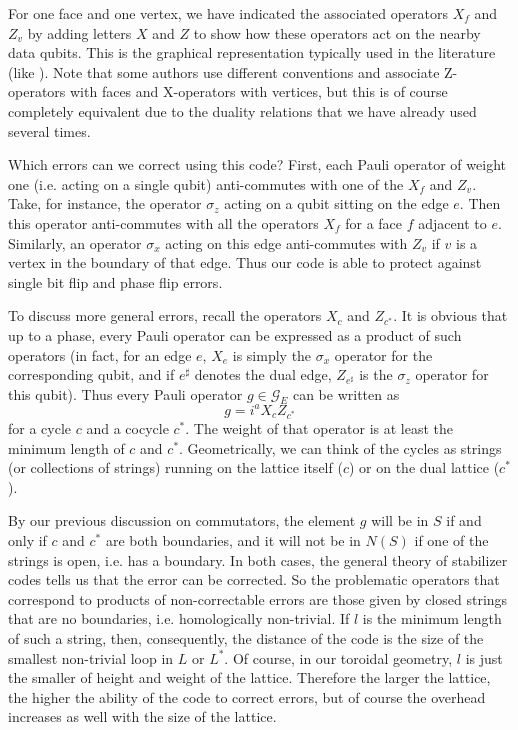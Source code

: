 \documentclass[a4paper, draft]{article}
\theoremstyle{own}
\theoremstyle{remark}
\begin{document}
For one face and one vertex, we have indicated the associated operators $X_f$ and $Z_v$ by adding letters $X$ and $Z$ to show how these operators act on the nearby data qubits. This is the graphical representation typically used in the literature (like \cite{SurfaceCodes}). Note that some authors use different conventions and associate Z-operators with faces and X-operators with vertices, but this is of course completely equivalent due to the duality relations that we have already used several times.


Which errors can we correct using this code? First, each Pauli operator of weight one (i.e. acting on a single qubit) anti-commutes with one of the $X_f$ and $Z_v$. Take, for instance, the operator $\sigma_z$ acting on a qubit sitting on the edge $e$. Then this operator anti-commutes with all the operators $X_f$ for a face $f$ adjacent to $e$. Similarly, an operator $\sigma_x$ acting on this edge anti-commutes with $Z_v$ if $v$ is a vertex in the boundary of that edge. Thus our code is able to protect against single bit flip and phase flip errors.

To discuss more general errors, recall the operators $X_c$ and $Z_{c^*}$. It is obvious that up to a phase, every Pauli operator can be expressed as a product of such operators (in fact, for an edge $e$, $X_e$ is simply the $\sigma_x$ operator for the corresponding qubit, and if $e^\sharp$ denotes the dual edge, $Z_{e^\sharp}$ is the $\sigma_z$ operator for this qubit). Thus every Pauli operator $g \in \mathcal{G}_E$ can be written as
$$
g = i^a  X_c Z_{c^*}
$$
for a cycle $c$ and a cocycle $c^*$. The weight of that operator is at least the minimum length of $c$ and $c^*$. Geometrically, we can think of the cycles as strings (or collections of strings) running on the lattice itself ($c$) or on the dual lattice ($c^*$).

By our previous discussion on commutators, the element $g$ will be in $S$ if and only if $c$ and $c^*$ are both boundaries, and it will not be in $N(S)$ if one of the strings is open, i.e. has a boundary. In both cases, the general theory of stabilizer codes tells us that the error can be corrected. So the problematic operators that correspond to products of non-correctable errors are those given by closed strings that are no boundaries, i.e. homologically non-trivial. If $l$ is the minimum length of such a string, then, consequently, the distance of the code is the size of the smallest non-trivial loop in $L$ or $L^*$. Of course, in our toroidal geometry, $l$ is just the smaller of height and weight of the lattice. Therefore the larger the lattice, the higher the ability of the code to correct errors, but of course the overhead increases as well with the size of the lattice. 
\end{document}
